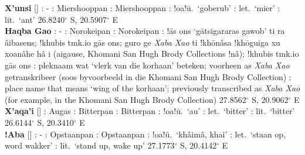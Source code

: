 \textbf{\textvertline{}X'unsi} []
: - : Miershooppan :
Miershooppan : !oa!\={u}.\
`\textdoublebarpipe{}goberub' : let.\ `mier'
\underbar{Eng}: lit.\ `ant' 26.8240$^{\circ}$ S, 20.5907$^{\circ}$ E
\\

\textbf{\textdoublevertline{}Haqba \textdoublevertline{}Gao}
: - : Norokeipan :
Norokeipan \underbar{Nama}: !\={a}s \textvertline{}ons
`\textdoublevertline{}g\={a}tsi\textdoublevertline{}gararas
\textdoublevertline{}gawob' ti ra \textdoublebarpipe{}\^{a}ibasens;
!khubis tmk.io \textdoublebarpipe{}g\={a}s \textvertline{}ons;
\textdoublebarpipe{}guro ge \emph{\textdoublevertline{}Xaba
\textdoublevertline{}Xao} ti !kh\={o}\textdoublevertline{}n\^{a}sa
!kh\={o}\textdoublevertline{}guiga xu xoa\textdoublevertline{}n\^{a}he
h\^{a} i (ai\textdoublevertline{}gause, \textdoublebarpipe{}Khomani
San Hugh Brody Collections !n\^{a}); !khubis tmk.io
\textdoublebarpipe{}g\={a}s \textvertline{}ons :
pleknaam wat `vlerk van die korhaan' beteken; voorheen as
\emph{\textdoublevertline{}Xaba \textdoublevertline{}Xao}
getranskribeer (soos byvoorbeeld in die \textdoublebarpipe{}Khomani
San Hugh Brody Collection) \underbar{Eng}: place name that means `wing
of the korhaan'; previously transcribed as
\emph{\textdoublevertline{}Xaba \textdoublevertline{}Xao} (for
example, in the \textdoublebarpipe{}Khomani San Hugh Brody Collection)
27.8562$^{\circ}$ S, 20.9062$^{\circ}$ E \\

\textbf{\textdoublevertline{}X'aqa'i}
[] :
Au\textdoublebarpipe{}gas : Bitterpan :
Bitterpan \underbar{Nama}: !oa!\={u}.\ `au' \underbar{Afr}: let.\
`bitter' \underbar{Eng}: lit.\ `bitter' 26.6144$^{\circ}$ S,
20.3410$^{\circ}$ E \\

\textbf{!Aba} [] : -
: Opstaanpan : Opstaanpan :
!oa!\={u}.\ `kh\^{a}im\^{a}, \textdoublebarpipe{}khai' :
let.\ `staan op, word wakker' \underbar{Eng}: lit.\ `stand up, wake
up' 27.1773$^{\circ}$ S, 20.4142$^{\circ}$ E \\


